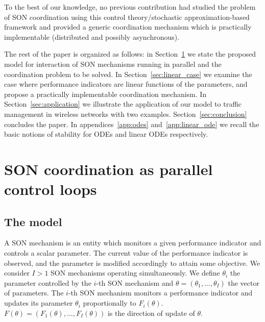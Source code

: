 \documentclass[10pt,conference,letterpaper]{IEEEtran}
\begin{document}
	To the best of our knowledge, no previous contribution had studied the problem of \ac{SON} coordination using this control theory/stochastic approximation-based framework and provided a generic coordination mechanism which is practically implementable (distributed and possibly asynchronous).

The rest of the paper is organized as follows: in Section~\ref{sec:parallel_control_loops} we state the proposed model for interaction of \ac{SON} mechanisms running in parallel and the coordination problem to be solved. In Section~\ref{sec:linear_case} we examine the case where performance indicators are linear functions of the parameters, and propose a practically implementable coordination mechanism. In Section~\ref{sec:application} we illustrate the application of our model to traffic management in wireless networks with two examples. Section~\ref{sec:conclusion} concludes the paper. In appendices~\ref{app:odes} and~\ref{app:linear_ode} we recall the basic notions of stability for \acp{ODE} and linear \acp{ODE} respectively.
\section{SON coordination as parallel control loops}\label{sec:parallel_control_loops}
\subsection{The model}
	A \ac{SON} mechanism is an entity which monitors a given performance indicator and controls a scalar parameter. The current value of the performance indicator is observed, and the parameter is modified accordingly to attain some objective. We consider $I > 1$ \ac{SON} mechanisms operating simultaneously. We define $\theta_i$ the parameter controlled by the $i$-th \ac{SON} mechanism and $\theta = (\theta_1,\dotsc,\theta_I)$ the vector of parameters. The $i$-th \ac{SON} mechanism monitors a performance indicator and updates its parameter $\theta_i$ proportionally to $F_i(\theta)$. $F(\theta) = (F_1(\theta),\dotsc,F_I(\theta))$ is the direction of update of $\theta$.
\end{document}
